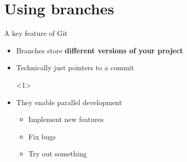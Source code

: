 \documentclass[usenames,svgnames,14pt]{beamer}
\begin{document}
\section{Using branches}
\begin{frame}{A key feature of Git}
    \vspace{-5mm}
    \begin{overlayarea}{\textwidth}{0.7\textheight}
        \begin{itemize}
            \item Branches store \textbf{different versions of your project}
            \item Technically just pointers to a commit\\[2\itemsep]
                  \begin{onlyenv}<1>
                  \end{onlyenv}
            \item<2-> They enable parallel development
                  \begin{itemize}
                      \item Implement new features
                      \item Fix bugs
                      \item Try out something

\end{itemize}
\end{itemize}
\end{overlayarea}
\end{frame}
\end{document}
